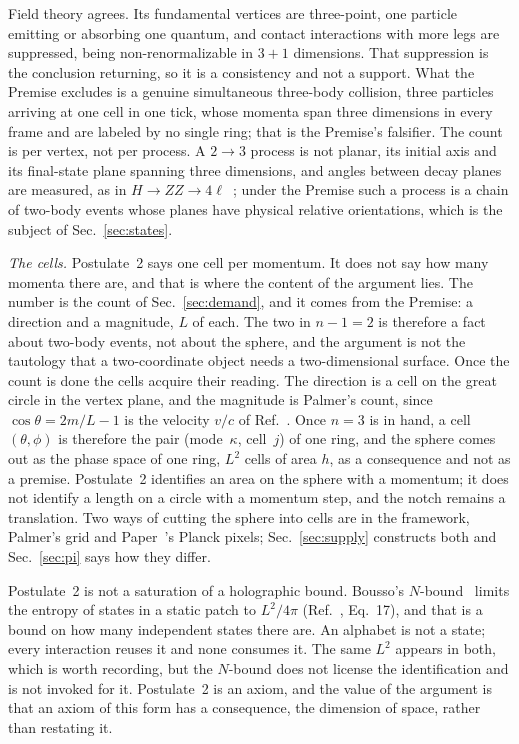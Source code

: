 \documentclass[aps,prd,twocolumn,superscriptaddress,nofootinbib]{revtex4-2}
\begin{document}
Field theory agrees. Its fundamental vertices are three-point, one particle emitting or absorbing one quantum, and contact interactions with more legs are suppressed, being non-renormalizable in $3+1$ dimensions. That suppression is the conclusion returning, so it is a consistency and not a support. What the Premise excludes is a genuine simultaneous three-body collision, three particles arriving at one cell in one tick, whose momenta span three dimensions in every frame and are labeled by no single ring; that is the Premise's falsifier. The count is per vertex, not per process. A $2\to3$ process is not planar, its initial axis and its final-state plane spanning three dimensions, and angles between decay planes are measured, as in $H\to ZZ\to4\ell$~\cite{cms2013}; under the Premise such a process is a chain of two-body events whose planes have physical relative orientations, which is the subject of Sec.~\ref{sec:states}.

\textit{The cells.} Postulate~2 says one cell per momentum. It does not say how many momenta there are, and that is where the content of the argument lies. The number is the count of Sec.~\ref{sec:demand}, and it comes from the Premise: a direction and a magnitude, $L$ of each. The two in $n-1 = 2$ is therefore a fact about two-body events, not about the sphere, and the argument is not the tautology that a two-coordinate object needs a two-dimensional surface. Once the count is done the cells acquire their reading. The direction is a cell on the great circle in the vertex plane, and the magnitude is Palmer's count, since $\cos\theta = 2m/L-1$ is the velocity $v/c$ of Ref.~\cite{korytko2026c}. Once $n = 3$ is in hand, a cell $(\theta,\phi)$ is therefore the pair (mode~$\kappa$, cell~$j$) of one ring, and the sphere comes out as the phase space of one ring, $L^2$ cells of area $h$, as a consequence and not as a premise. Postulate~2 identifies an area on the sphere with a momentum; it does not identify a length on a circle with a momentum step, and the notch remains a translation. Two ways of cutting the sphere into cells are in the framework, Palmer's grid and Paper~\cite{korytko2026}'s Planck pixels; Sec.~\ref{sec:supply} constructs both and Sec.~\ref{sec:pi} says how they differ.

Postulate~2 is not a saturation of a holographic bound. Bousso's $N$-bound~\cite{bousso2000} limits the entropy of states in a static patch to $L^2/4\pi$ (Ref.~\cite{korytko2026c}, Eq.~17), and that is a bound on how many independent states there are. An alphabet is not a state; every interaction reuses it and none consumes it. The same $L^2$ appears in both, which is worth recording, but the $N$-bound does not license the identification and is not invoked for it. Postulate~2 is an axiom, and the value of the argument is that an axiom of this form has a consequence, the dimension of space, rather than restating it.
\end{document}

